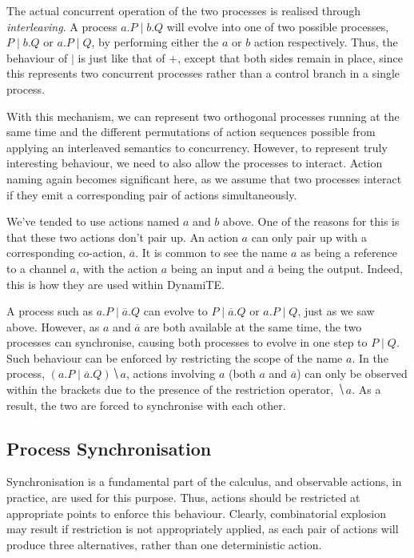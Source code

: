 \documentclass{acm_proc_article-sp}
\begin{document}
The actual concurrent operation of the two processes is realised through
\emph{interleaving}.  A process $a.P \mid b.Q$ will evolve into one of
two possible processes, $P \mid b.Q$ or $a.P \mid Q$, by performing
either the $a$ or $b$ action respectively.  Thus, the behaviour of
$\mid$ is just like that of $+$, except that both sides remain in place,
since this represents two concurrent processes rather than a control
branch in a single process.

With this mechanism, we can represent two orthogonal processes running
at the same time and the different permutations of action sequences
possible from applying an interleaved semantics to concurrency.
However, to represent truly interesting behaviour, we need to also
allow the processes to interact.  Action naming again becomes
significant here, as we assume that two processes interact if they emit
a corresponding pair of actions simultaneously.

We've tended to use actions named $a$ and $b$ above.  One of the reasons
for this is that these two actions don't pair up.  An action $a$ can
only pair up with a corresponding co-action, $\overline{a}$.  It is
common to see the name $a$ as being a reference to a channel $a$, with
the action $a$ being an input and $\overline{a}$ being the output.
Indeed, this is how they are used within DynamiTE.

A process such as $a.P \mid \overline{a}.Q$ can evolve to $P \mid
\overline{a}.Q$ or $a.P \mid Q$, just as we saw above.  However, as $a$
and $\overline{a}$ are both available at the same time, the two
processes can synchronise, causing both processes to evolve in one
step to $P \mid Q$.  Such behaviour can be enforced by restricting the
scope of the name $a$.  In the process, $(a.P \mid \overline{a}.Q)
\hide{a}$, actions involving $a$ (both $a$ and $\overline{a}$) can only
be observed within the brackets due to the presence of the restriction
operator, $\hide{a}$.  As a result, the two are forced to synchronise
with each other.

\subsection{Process Synchronisation}
\label{sync}

Synchronisation is a fundamental part of the calculus, and observable
actions, in practice, are used for this purpose.  Thus, actions should
be restricted at appropriate points to enforce this behaviour.  Clearly,
combinatorial explosion may result if restriction is not appropriately
applied, as each pair of actions will produce three alternatives, rather
than one deterministic action.  
\end{document}
